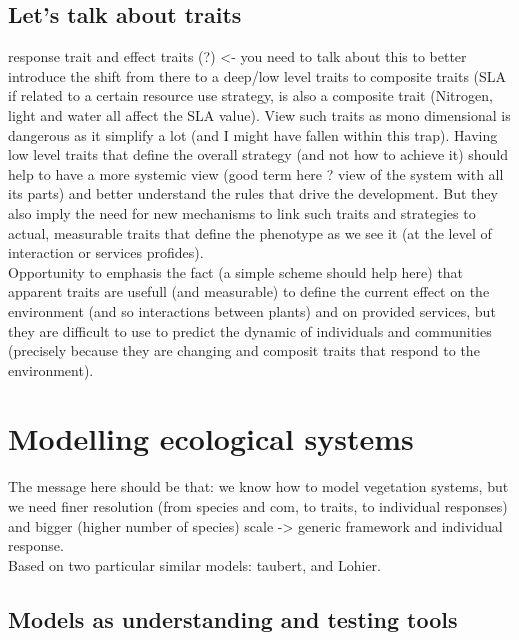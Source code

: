 \section{Let's talk about traits} %
response trait and effect traits (?) <- you need to talk about this to better introduce the shift from there to a deep/low level traits to composite traits (SLA if related to a certain resource use strategy, is also a composite trait (Nitrogen, light and water all affect the SLA value). View such traits as mono dimensional is dangerous as it simplify a lot (and I might have fallen within this trap). Having low level traits that define the overall strategy (and not how to achieve it) should help to have a more systemic view (good term here ? view of the system with all its parts) and better understand the rules that drive the development. But they also imply the need for new mechanisms to link such traits and strategies to actual, measurable traits that define the phenotype as we see it (at the level of interaction or services profides). \\
Opportunity to emphasis the fact (a simple scheme should help here) that apparent traits are usefull (and measurable) to define the current effect on the environment (and so interactions between plants) and on provided services, but they are difficult to use to predict the dynamic of individuals and communities (precisely because they are changing and composit traits that respond to the environment).



\chapter{Modelling ecological systems}
The message here should be that: we know how to model vegetation systems, but we need finer resolution (from species and com, to traits, to individual responses) and bigger (higher number of species) scale -> generic framework and individual response.\\
Based on two particular similar models: taubert, and Lohier.

\section{Models as understanding and testing tools}

